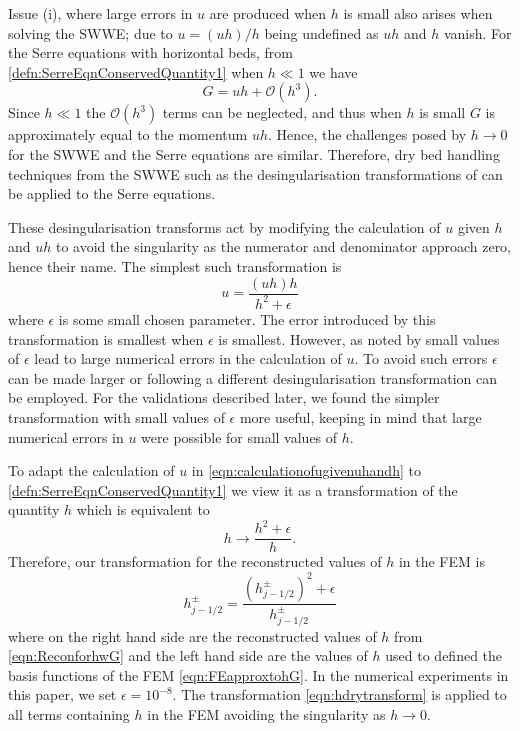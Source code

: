 \documentclass[times]{elsarticle}
\begin{document}
Issue (i), where large errors in $u$ are produced when $h$ is small also arises when solving the SWWE; due to $u = (uh)/h $ being undefined as $u h $ and $h$ vanish. For the Serre equations with horizontal beds, from \eqref{defn:SerreEqnConservedQuantity1} when $h \ll 1$ we have
\begin{equation*}
G = uh + \mathcal{O}\left(h^3\right).
\end{equation*}
Since $h \ll 1$ the $\mathcal{O}\left(h^3\right)$ terms can be neglected, and thus when $h$ is small $G$ is approximately equal to the momentum $uh$. Hence, the challenges posed by $h \rightarrow 0$ for the SWWE and the Serre equations are similar. Therefore, dry bed handling techniques from the SWWE such as the desingularisation transformations of \citet{Kurganov-Petrova-2007-707} can be applied to the Serre equations. 

These desingularisation transforms act by modifying the calculation of $u$ given $h$ and $uh$ to avoid the singularity as the numerator and denominator approach zero, hence their name. The simplest such transformation is
\begin{equation}
u = \frac{(uh) h}{h^2 + \epsilon}
\label{eqn:calculationofugivenuhandh}
\end{equation}
where $\epsilon$ is some small chosen parameter. The error introduced by this transformation is smallest when $\epsilon$ is smallest. However, as noted by \citet{Kurganov-Petrova-2007-707} small values of $\epsilon$ lead to large numerical errors in the calculation of $u$. To avoid such errors $\epsilon$ can be made larger or following \citet{Kurganov-Petrova-2007-707} a different desingularisation transformation can be employed. For the validations described later, we found the simpler transformation with small values of $\epsilon$ more useful, keeping in mind that large numerical errors in $u$ were possible for small values of $h$. 

To adapt the calculation of $u$ in \eqref{eqn:calculationofugivenuhandh} to \eqref{defn:SerreEqnConservedQuantity1} we view it as a transformation of the quantity $h$ which is equivalent to
\begin{equation}
\label{eqn:hsimpletransform}
h \rightarrow  \frac{h^2 + \epsilon}{h}.
\end{equation}
Therefore, our transformation for the reconstructed values of $h$ in the FEM is
\begin{equation}
\label{eqn:hdrytransform}
h^\pm_{j-1/2}  = \frac{ \left(h^\pm_{j-1/2} \right)^2  + \epsilon}{h^\pm_{j-1/2}}
\end{equation} 
where on the right hand side are the reconstructed values of $h$ from \eqref{eqn:ReconforhwG} and the left hand side are the values of $h$ used to defined the basis functions of the FEM \eqref{eqn:FEapproxtohG}. In the numerical experiments in this paper, we set $\epsilon = 10^{-8}$. The transformation \eqref{eqn:hdrytransform} is applied to all terms containing $h$ in the FEM avoiding the singularity as $h \rightarrow 0$.
\end{document}
